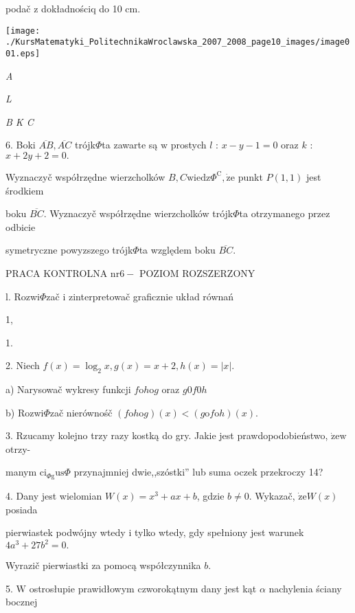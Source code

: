 \documentclass[a4paper,12pt]{article}
\begin{document}
podač $\mathrm{z}$ dokładnościq do 10 cm.
\begin{center}
\texttt{[image: ./KursMatematyki\_PolitechnikaWroclawska\_2007\_2008\_page10\_images/image001.eps]}
\end{center}
{\it A}

{\it L}

{\it B  K C}

6. Boki $\overline{AB}, \overline{AC}$ trójk$\Phi$ta zawarte są $\mathrm{w}$ prostych $l$ : $x-y-1=0$ oraz $k$ : $x+2y+2=0.$

Wyznaczyč współrzędne wierzcholków $B, C \mathrm{w}\mathrm{i}\mathrm{e}\mathrm{d}\mathrm{z}\Phi^{\mathrm{C}}, \dot{\mathrm{z}}\mathrm{e}$ punkt $P(1,1)$ jest środkiem

boku $\overline{BC}$. Wyznaczyč współrzędne wierzcholków trójk$\Phi$ta otrzymanego przez odbicie

symetryczne powyzszego trójk$\Phi$ta względem boku $\overline{BC}.$





PRACA KONTROLNA $\mathrm{n}\mathrm{r} 6-$ POZIOM ROZSZERZONY

l. Rozwi$\Phi$zač $\mathrm{i}$ zinterpretowač graficznie układ równań 

1,

1.

2. Niech $f(x)=\log_{2}x, g(x)=x+2, h(x)=|x|.$

a) Narysowač wykresy funkcji $f\mathrm{o}h\mathrm{o}g$ oraz $g0f0h$

b) Rozwi$\Phi$zač nierównośč $(f\mathrm{o}h\mathrm{o}g)(x)<(g\mathrm{o}f\mathrm{o}h)(x).$

3. Rzucamy kolejno trzy razy kostką do gry. Jakie jest prawdopodobieństwo, $\dot{\mathrm{z}}\mathrm{e}\mathrm{w}$ otrzy-

manym $\mathrm{c}\mathrm{i}_{\Phi \mathrm{g}}\mathrm{u}\mathrm{s}\Phi$ przynajmniej dwie,,szóstki'' lub suma oczek przekroczy 14?

4. Dany jest wielomian $W(x) = x^{3}+ax+b$, gdzie $b \neq 0$. Wykazač, $\dot{\mathrm{z}}\mathrm{e} W(x)$ posiada

pierwiastek podwójny wtedy $\mathrm{i}$ tylko wtedy, gdy spełniony jest warunek $4a^{3}+27b^{2}=0.$

Wyrazič pierwiastki za pomocą współczynnika $b.$

5. $\mathrm{W}$ ostrosłupie prawidłowym czworokątnym dany jest kąt $\alpha$ nachylenia ściany bocznej
\end{document}
